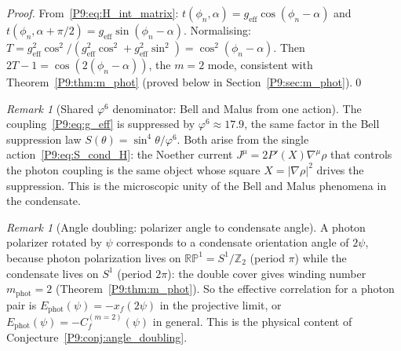 \documentclass[11pt,a4paper]{article}
\theoremstyle{definition}
\theoremstyle{remark}
\newtheorem{remark}[theorem]{Remark}
\newcommand{\vp}{\varphi}
\begin{document}
\begin{proof}
From~\eqref{P9:eq:H_int_matrix}: $t(\phi_n,\alpha)=g_\mathrm{eff}\cos(\phi_n-\alpha)$
and $t(\phi_n,\alpha+\pi/2)=g_\mathrm{eff}\sin(\phi_n-\alpha)$.
Normalising:
$T = g_\mathrm{eff}^2\cos^2/(g_\mathrm{eff}^2\cos^2+g_\mathrm{eff}^2\sin^2) = \cos^2(\phi_n-\alpha)$.
Then $2T-1=\cos(2(\phi_n-\alpha))$, the $m=2$ mode, consistent with
Theorem~\ref{P9:thm:m_phot} (proved below in Section~\ref{P9:sec:m_phot}).\qed
\end{proof}

\begin{remark}[Shared $\vp^6$ denominator: Bell and Malus from one action]
\label{P9:rem:phi6_connection}
The coupling~\eqref{P9:eq:g_eff} is suppressed by $\vp^6\approx17.9$,
the same factor in the Bell suppression law $S(\theta)=\sin^4\theta/\vp^6$.
Both arise from the single action~\eqref{P9:eq:S_cond_H}: the Noether current
$J^\mu=2P'(X)\nabla^\mu\rho$ that controls the photon coupling is the same
object whose square $X=|\nabla\rho|^2$ drives the suppression.
This is the microscopic unity of the Bell and Malus phenomena in the condensate.
\end{remark}


\begin{remark}[Angle doubling: polarizer angle to condensate angle]
\label{P9:rem:winding}
A photon polarizer rotated by $\psi$ corresponds to a condensate
orientation angle of $2\psi$, because photon polarization lives on
$\mathbb{RP}^1 = S^1/\mathbb{Z}_2$ (period $\pi$) while the condensate
lives on $S^1$ (period $2\pi$): the double cover gives winding number
$m_\mathrm{phot}=2$ (Theorem~\ref{P9:thm:m_phot}).
So the effective correlation for a photon pair is
$E_\mathrm{phot}(\psi) = -x_f(2\psi)$ in the projective limit,
or $E_\mathrm{phot}(\psi) = -C_f^{(m=2)}(\psi)$ in general.
This is the physical content of Conjecture~\ref{P9:conj:angle_doubling}.
\end{remark}
\end{document}
